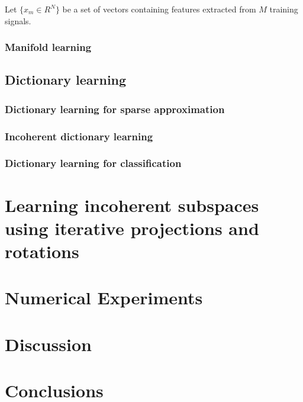 \documentclass[]{article}
\begin{document}
Let $\{x_m \in R^N\}$ be a set of vectors containing features extracted from $M$ training signals.

\subsubsection{Manifold learning}
\label{sec-2-1-2}

\subsection{Dictionary learning}
\label{sec-2-2}
\subsubsection{Dictionary learning for sparse approximation}
\label{sec-2-2-1}
\subsubsection{Incoherent dictionary learning}
\label{sec-2-2-2}
\subsubsection{Dictionary learning for classification}
\label{sec-2-2-3}

\section{Learning incoherent subspaces using iterative projections and rotations}
\label{sec-3}
\section{Numerical Experiments}
\label{sec-4}
\section{Discussion}
\label{sec-5}
\section{Conclusions}
\label{sec-6}
\end{document}
